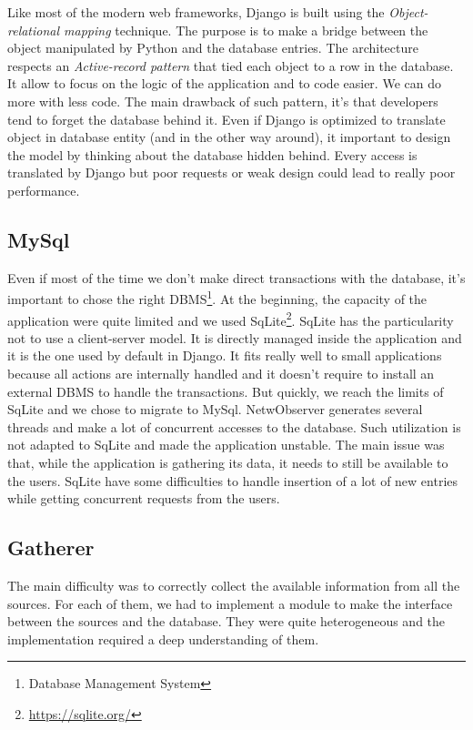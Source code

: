 Like most of the modern web frameworks, Django is built using the \emph{Object-relational mapping} technique. The purpose is to make a bridge between the object manipulated by Python and the database entries. The architecture respects an \emph{Active-record pattern} that tied each object to a row in the database. It allow to focus on the logic of the application and to code easier. We can do more with less code. The main drawback of such pattern, it's that developers tend to forget the database behind it. Even if Django is optimized to translate object in database entity (and in the other way around), it important to design the model by thinking about the database hidden behind. Every access is translated by Django but poor requests or weak design could lead to really poor performance.

\subsection{MySql}
Even if most of the time we don't make direct transactions with the database, it's important to chose the right DBMS\footnote{Database Management System}. At the beginning, the capacity of the application were quite limited and we used SqLite\footnote{\url{https://sqlite.org/}}. SqLite has the particularity not to use a client-server model. It is directly managed inside the application and it is the one used by default in Django. It fits really well to small applications because all actions are internally handled and it doesn't require to install an external DBMS to handle the transactions. But quickly, we reach the limits of SqLite and we chose to migrate to MySql. NetwObserver generates several threads and make a lot of concurrent accesses to the database. Such utilization is not adapted to SqLite and made the application unstable. The main issue was that, while the application is gathering its data, it needs to still be available to the users. SqLite have some difficulties to handle insertion of a lot of new entries while getting concurrent requests from the users.

\subsection{Gatherer}
The main difficulty was to correctly collect the available information from all the sources. For each of them, we had to implement a module to make the interface between the sources and the database. They were quite heterogeneous and the implementation required a deep understanding of them.


